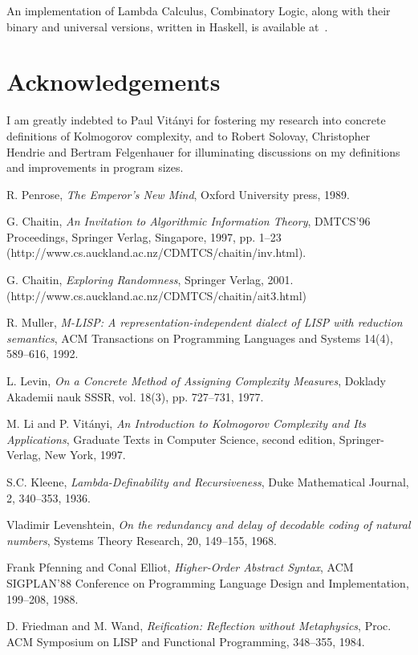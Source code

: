 \documentclass{article}
\begin{document}
An implementation of Lambda Calculus, Combinatory Logic,
along with their binary and universal versions,
written in Haskell, is available at~\cite{tromp}.

\section{Acknowledgements}
I am greatly indebted to Paul Vit\'{a}nyi for fostering my research into concrete definitions
of Kolmogorov complexity, and to Robert Solovay, Christopher Hendrie and Bertram Felgenhauer
for illuminating discussions on my definitions and improvements in program sizes.
\begin{thebibliography}{9}

R. Penrose, {\it The Emperor's New Mind},
Oxford University press, 1989.

G. Chaitin, {\it An Invitation to Algorithmic Information Theory},
DMTCS'96 Proceedings, Springer Verlag, Singapore, 1997, pp. 1--23
(http://www.cs.auckland.ac.nz/CDMTCS/chaitin/inv.html).

G. Chaitin, {\it Exploring Randomness}, Springer Verlag, 2001.
(http://www.cs.auckland.ac.nz/CDMTCS/chaitin/ait3.html)

R. Muller, {\it M-LISP: A representation-independent dialect of LISP
with reduction semantics}, ACM Transactions on Programming Languages
and Systems 14(4), 589--616, 1992.

L. Levin,
{\it On a Concrete Method of Assigning Complexity Measures},
Doklady Akademii nauk SSSR, vol. 18(3), pp. 727--731, 1977. 

M. Li and P. Vit\'anyi,
{\it An Introduction to Kolmogorov Complexity and Its Applications},
Graduate Texts in Computer Science, second edition, Springer-Verlag,
New York, 1997.

S.C. Kleene,
{\it Lambda-Definability and Recursiveness},
Duke Mathematical Journal, 2, 340--353, 1936.

Vladimir Levenshtein,
{\it On the redundancy and delay of decodable coding of natural numbers},
Systems Theory Research, 20, 149--155, 1968.

Frank Pfenning and Conal Elliot,
{\it Higher-Order Abstract Syntax},
ACM SIGPLAN'88 Conference on Programming Language Design and Implementation,
199--208, 1988.

D. Friedman and M. Wand,
{\it Reification: Reflection without Metaphysics},
Proc. ACM Symposium on
LISP and Functional Programming, 348--355, 1984.


\end{thebibliography}
\end{document}
